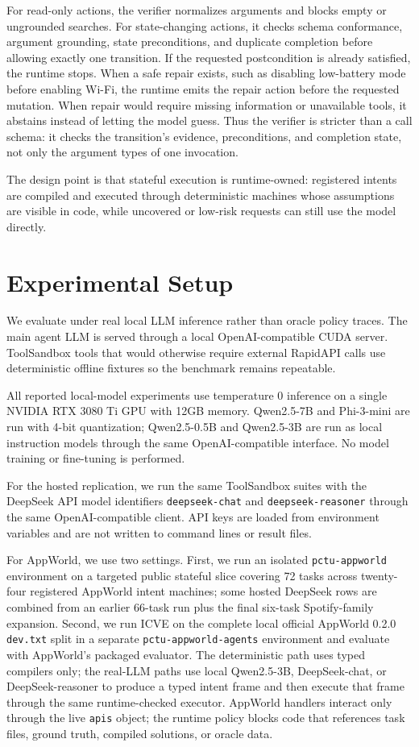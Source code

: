 \documentclass[11pt]{article}
\begin{document}
For read-only actions, the verifier normalizes arguments and blocks empty or ungrounded
searches. For state-changing actions, it checks schema conformance, argument grounding,
state preconditions, and duplicate completion before allowing exactly one transition. If
the requested postcondition is already satisfied, the runtime stops. When a safe repair
exists, such as disabling low-battery mode before enabling Wi-Fi, the runtime emits the
repair action before the requested mutation. When repair would require missing
information or unavailable tools, it abstains instead of letting the model guess.
Thus the verifier is stricter than a call schema: it checks the transition's evidence,
preconditions, and completion state, not only the argument types of one invocation.

The design point is that stateful execution is runtime-owned: registered intents are
compiled and executed through deterministic machines whose assumptions are visible in
code, while uncovered or low-risk requests can still use the model directly.

\section{Experimental Setup}

We evaluate under real local LLM inference rather than oracle policy traces. The main
agent LLM is served through a local OpenAI-compatible CUDA server. ToolSandbox tools that
would otherwise require external RapidAPI calls use deterministic offline fixtures so the
benchmark remains repeatable.

All reported local-model experiments use temperature 0 inference on a single NVIDIA RTX
3080 Ti GPU with 12GB memory. Qwen2.5-7B and Phi-3-mini are run with 4-bit quantization;
Qwen2.5-0.5B and Qwen2.5-3B are run as local instruction models through the same
OpenAI-compatible interface. No model training or fine-tuning is performed.

For the hosted replication, we run the same ToolSandbox suites with the DeepSeek API
model identifiers \texttt{deepseek-chat} and \texttt{deepseek-reasoner} through the same
OpenAI-compatible client. API keys are loaded from environment variables and are not
written to command lines or result files.

For AppWorld, we use two settings. First, we run an isolated \texttt{pctu-appworld}
environment on a targeted public stateful slice covering 72 tasks across twenty-four
registered AppWorld intent machines; some hosted DeepSeek rows are combined from an
earlier 66-task run plus the final six-task Spotify-family expansion. Second, we run
ICVE on the complete local official AppWorld 0.2.0 \texttt{dev.txt} split in a separate
\texttt{pctu-appworld-agents} environment and evaluate with AppWorld's packaged
evaluator. The deterministic path uses typed compilers only; the real-LLM paths use
local Qwen2.5-3B, DeepSeek-chat, or DeepSeek-reasoner to produce a typed intent frame
and then execute that frame through the same runtime-checked executor. AppWorld handlers
interact only through the live \texttt{apis} object; the runtime policy blocks code that
references task files, ground truth, compiled solutions, or oracle data.
\end{document}

